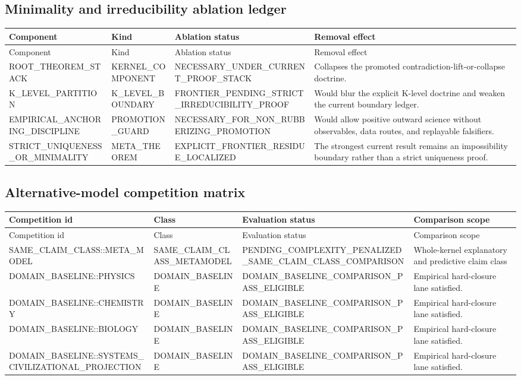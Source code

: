 \subsection{Minimality and irreducibility ablation ledger}
\begin{longtable}{p{}p{}p{}p{}}
\toprule
Component & Kind & Ablation status & Removal effect \\
\midrule
\endfirsthead
\toprule
Component & Kind & Ablation status & Removal effect \\
\midrule
\endhead
ROOT\_THEOREM\_STACK & KERNEL\_COMPONENT & NECESSARY\_UNDER\_CURRENT\_PROOF\_STACK & Collapses the promoted contradiction-lift-or-collapse doctrine. \\
K\_LEVEL\_PARTITION & K\_LEVEL\_BOUNDARY & FRONTIER\_PENDING\_STRICT\_IRREDUCIBILITY\_PROOF & Would blur the explicit K-level doctrine and weaken the current boundary ledger. \\
EMPIRICAL\_ANCHORING\_DISCIPLINE & PROMOTION\_GUARD & NECESSARY\_FOR\_NON\_RUBBERIZING\_PROMOTION & Would allow positive outward science without observables, data routes, and replayable falsifiers. \\
STRICT\_UNIQUENESS\_OR\_MINIMALITY & META\_THEOREM & EXPLICIT\_FRONTIER\_RESIDUE\_LOCALIZED & The strongest current result remains an impossibility boundary rather than a strict uniqueness proof. \\
\bottomrule
\end{longtable}

\subsection{Alternative-model competition matrix}
\begin{longtable}{p{}p{}p{}p{}}
\toprule
Competition id & Class & Evaluation status & Comparison scope \\
\midrule
\endfirsthead
\toprule
Competition id & Class & Evaluation status & Comparison scope \\
\midrule
\endhead
SAME\_CLAIM\_CLASS::META\_MODEL & SAME\_CLAIM\_CLASS\_METAMODEL & PENDING\_COMPLEXITY\_PENALIZED\_SAME\_CLAIM\_CLASS\_COMPARISON & Whole-kernel explanatory and predictive claim class \\
DOMAIN\_BASELINE::PHYSICS & DOMAIN\_BASELINE & DOMAIN\_BASELINE\_COMPARISON\_PASS\_ELIGIBLE & Empirical hard-closure lane satisfied. \\
DOMAIN\_BASELINE::CHEMISTRY & DOMAIN\_BASELINE & DOMAIN\_BASELINE\_COMPARISON\_PASS\_ELIGIBLE & Empirical hard-closure lane satisfied. \\
DOMAIN\_BASELINE::BIOLOGY & DOMAIN\_BASELINE & DOMAIN\_BASELINE\_COMPARISON\_PASS\_ELIGIBLE & Empirical hard-closure lane satisfied. \\
DOMAIN\_BASELINE::SYSTEMS\_CIVILIZATIONAL\_PROJECTION & DOMAIN\_BASELINE & DOMAIN\_BASELINE\_COMPARISON\_PASS\_ELIGIBLE & Empirical hard-closure lane satisfied. \\
\bottomrule
\end{longtable}

